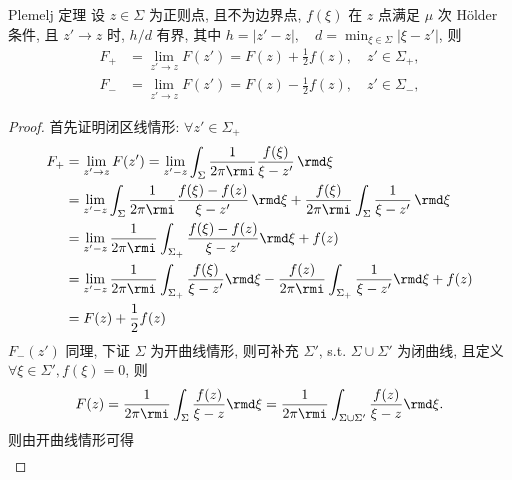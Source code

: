 \begin{theorem}{Plemelj 定理}
    设 $ z \in \Sigma $ 为正则点, 且不为边界点, $ f(\xi) $ 在 $ z $ 点满足 $ \mu $ 次 H\"older 条件, 且 $ z' \to z $ 时, $ h/d $ 有界, 其中 $ h = | z' - z|, \quad d = \min_{\xi \in \Sigma} |\xi - z' | $, 则
    \begin{align}
        F_{+} & = \lim_{z' \to z} F(z') = F(z) + \frac{1}{2}f(z), \quad z' \in \Sigma_{+}, \label{ch1-eq-Plemelj-1} \\
        F_{-} & = \lim_{z' \to z} F(z') = F(z) - \frac{1}{2}f(z), \quad z' \in \Sigma_{-}, \label{ch1-eq-Plemelj-2}
    \end{align}
\end{theorem}
\begin{proof}
    首先证明闭区线情形: $\forall z' \in \Sigma_{+}$
    \begin{equation}
        \begin{aligned}
            F_{+} & = \lim_{z' \to z} F(z') = \lim_{z' - z} \int_{\Sigma} \frac{1}{2 \pi \rmi} \frac{f(\xi)}{\xi - z'} \, \rmd \xi                                                            \\
                  & = \lim_{z' - z} \int_{\Sigma} \frac{1}{2 \pi \rmi} \frac{f(\xi) - f(z)}{\xi - z'} \, \rmd \xi + \frac{f(\xi)}{2 \pi \rmi} \int_{\Sigma} \frac{1}{\xi - z'} \, \rmd \xi    \\
                  & = \lim_{z' - z} \frac{1}{2 \pi \rmi} \int_{\Sigma_{+}}  \frac{f(\xi) - f(z)}{\xi - z'}  \rmd \xi + f(z)                                                                   \\
                  & = \lim_{z' - z} \frac{1}{2 \pi \rmi} \int_{\Sigma_{+}}  \frac{f(\xi)}{\xi - z'}  \rmd \xi - \frac{f(z)}{2 \pi \rmi} \int_{\Sigma_{+}}  \frac{1}{\xi - z'}  \rmd \xi+ f(z) \\
                  & = F(z) + \frac{1}{2}f(z)
        \end{aligned}
    \end{equation}
    $ F_{-}(z') $ 同理, 下证 $ \Sigma $ 为开曲线情形, 则可补充 $ \Sigma' $, s.t. $ \Sigma \cup \Sigma' $ 为闭曲线, 且定义 $ \forall \xi \in \Sigma', f(\xi) = 0 $, 则
    \begin{equation}
        F(z) = \frac{1}{2 \pi \rmi} \int_{\Sigma}  \frac{f(z)}{\xi - z}  \rmd \xi = \frac{1}{2 \pi \rmi} \int_{\Sigma \cup \Sigma'}  \frac{f(z)}{\xi - z}  \rmd \xi.
    \end{equation}
    则由开曲线情形可得
    \begin{equation}
        \begin{aligned}

\end{aligned}
\end{equation}
\end{proof}

